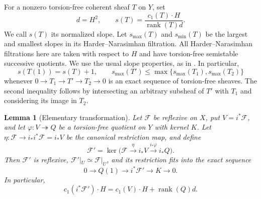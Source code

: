 \documentclass[11pt,reqno]{amsart}
\numberwithin{equation}{section}
\newtheorem{lemma}[theorem]{Lemma}
\theoremstyle{definition}
\theoremstyle{remark}
\newcommand{\FF}{\mathcal F}
\newcommand{\rk}{\operatorname{rank}}
\newcommand{\smax}{s_{\max}}
\newcommand{\smin}{s_{\min}}
\begin{document}
For a nonzero torsion-free coherent sheaf $T$ on $Y$, set
\[
 d=H^2,\qquad
 s(T)=\frac{c_1(T)\cdot H}{\rk(T)d}.
\]
We call $s(T)$ its normalized slope. Let $\smax(T)$ and $\smin(T)$
be the largest and smallest slopes in its Harder--Narasimhan filtration.
All Harder--Narasimhan filtrations here are taken with respect to $H$
and have torsion-free semistable successive quotients. We use the usual
slope properties, as in \cite[Sections 1.3 and 1.6]{HuybrechtsLehn2010}.
In particular,
\begin{equation}\label{eq:slope-properties}
 s(T(1))=s(T)+1,\qquad
 \smax(T')\leq\max\{\smax(T_1),\smax(T_2)\}
\end{equation}
whenever $0\to T_1\to T'\to T_2\to0$ is an exact sequence of
torsion-free sheaves. The second inequality follows by intersecting an
arbitrary subsheaf of $T'$ with $T_1$ and considering its image in $T_2$.

\begin{lemma}[Elementary transformation]\label{lem:hecke}
Let $\FF$ be reflexive on $X$, put $V=i^*\FF$, and let
$\varphi:V\twoheadrightarrow Q$ be a torsion-free quotient on $Y$ with
kernel $K$. Let $\eta:\FF\to i_*i^*\FF=i_*V$ be the canonical
restriction map, and define
\begin{equation}\label{eq:hecke-definition}
 \FF'=\ker\bigl(\FF\xrightarrow{\eta}i_*V
                      \xrightarrow{i_*\varphi}i_*Q\bigr).
\end{equation}
Then $\FF'$ is reflexive, $\FF'|_U\simeq\FF|_U$, and its restriction
fits into the exact sequence
\begin{equation}\label{eq:hecke-restriction}
 0\longrightarrow Q(1)\longrightarrow i^*\FF'
   \longrightarrow K\longrightarrow0.
\end{equation}
In particular,
\begin{equation}\label{eq:degree-increase}
 c_1(i^*\FF')\cdot H=c_1(V)\cdot H+\rk(Q)d.
\end{equation}
\end{lemma}
\end{document}
